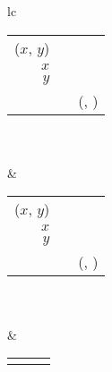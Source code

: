 {\begin{tabular}{lc}
%
\begin{tabular}{rcl}
%
\dur($x$, $y$)& \cut & \eff  \\
$x$ & \connect & \eff \\
$y$ & \connect & \eff 
%
\\[6pt]
%
\eff &\cut& \dur(\eff, \eff)
%
\end{tabular} \\ \\
%
%
 &
%
\begin{tabular}{rcl}
%
\dun($x$, $y$) & \cut & \eff \\
$x$ & \connect & \eff \\
$y$ & \connect & \eff 
%
\\[6pt]
%
\eff &\cut& \dun(\eff, \eff)
%
\end{tabular} \\ \\
%
%
 &
%
\begin{tabular}{rcl}
%
\eff & \cut & \eff
%
\end{tabular}
%
\end{tabular}
}






